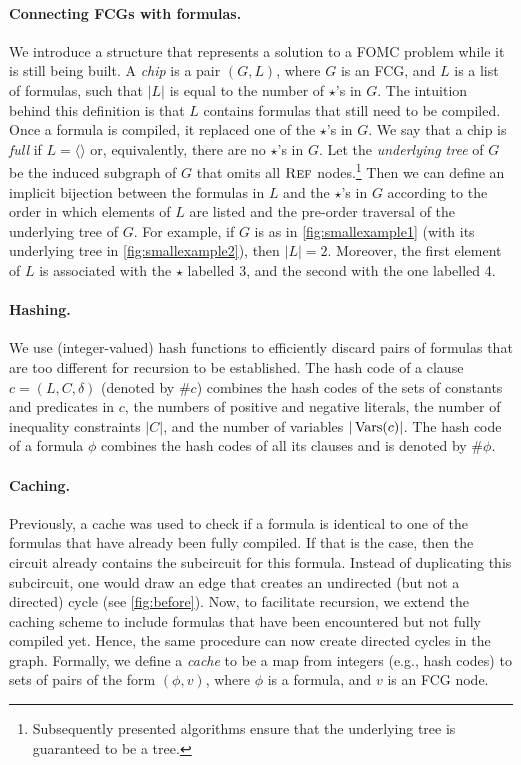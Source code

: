 \paragraph{Connecting FCGs with formulas.} We introduce a structure that
represents a solution to a FOMC problem while it is still being built. A
\emph{chip} is a pair $(G, L)$, where $G$ is an FCG, and $L$ is a list of
formulas, such that $|L|$ is equal to the number of $\star$'s in $G$. The
intuition behind this definition is that $L$ contains formulas that still need
to be compiled. Once a formula is compiled, it replaced one of the $\star$'s in
$G$. We say that a chip is \emph{full} if $L = \langle \rangle$ or,
equivalently, there are no $\star$'s in $G$. Let the \emph{underlying tree} of
$G$ be the induced subgraph of $G$ that omits all $\operatorname{\textsc{Ref}}$
nodes.\footnote{Subsequently presented algorithms ensure that the underlying
  tree is guaranteed to be a tree.} Then we can define an implicit bijection
between the formulas in $L$ and the $\star$'s in $G$ according to the order in
which elements of $L$ are listed and the pre-order traversal of the underlying
tree of $G$. For example, if $G$ is as in \cref{fig:smallexample1} (with its
underlying tree in \cref{fig:smallexample2}), then $|L| = 2$. Moreover, the
first element of $L$ is associated with the $\star$ labelled 3, and the second
with the one labelled 4.

\paragraph{Hashing.}
We use (integer-valued) hash functions to efficiently discard pairs of formulas
that are too different for recursion to be established. The hash code of a
clause $c = (L, C, \delta)$ (denoted by $\# c$) combines the hash codes of the
sets of constants and predicates in $c$, the numbers of positive and negative
literals, the number of inequality constraints $|C|$, and the number of
variables $|\operatorname{Vars}(c)|$. The hash code of a formula $\phi$ combines the hash
codes of all its clauses and is denoted by $\#\phi$.

\paragraph{Caching.}
Previously, a cache was used to check if a formula is identical to one of the
formulas that have already been fully compiled. If that is the case, then the
circuit already contains the subcircuit for this formula. Instead of duplicating
this subcircuit, one would draw an edge that creates an undirected (but not a
directed) cycle (see \cref{fig:before}). Now, to facilitate recursion, we extend
the caching scheme to include formulas that have been encountered but not fully
compiled yet. Hence, the same procedure can now create directed cycles in the
graph. Formally, we define a \emph{cache} to be a map from integers (e.g., hash
codes) to sets of pairs of the form $(\phi, v)$, where $\phi$ is a formula, and
$v$ is an FCG node.


